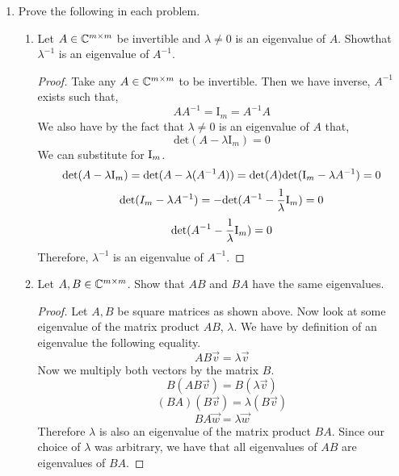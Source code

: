 \documentclass{article}
\begin{document}
\begin{enumerate}
\begin{proof}
We then define the matrix $C = A^*$, $C^* = A$. Notice that C is an upper triangular, unitary matrix. By the previous proof, $C$ is a diagonal matrix. Notice all of its ``off-diagonal'' elements are zero. As a consequnce, all (i, j)-elements of $C$ which are zero imply that (j, i)-elements of $C^*$ are zero. Therefore, $C^* = A$ is a diagonal matrix.


\end{proof}

\item 
Prove the following in each problem.
\begin{enumerate}

    \item
    Let $A \in \mathbb{C}^{m \times m}$ be invertible and $\lambda \neq 0$ is an eigenvalue of $A$. Showthat $\lambda^{-1}$ is an eigenvalue of $A^{-1}$.

    \begin{proof}

    Take any $A \in \mathbb{C}^{m\times m}$ to be invertible. Then we have inverse, $A^{-1}$ exists such that, 
    \[
        AA^{-1} = \mathrm{I}_m = A^{-1}A
    \]
    We also have by the fact that $\lambda \neq 0$ is an eigenvalue of $A$ that, 
    \[
        \text{det}(A - \lambda\mathrm{I}_m) = 0
    \]
    We can substitute for $\mathrm{I}_m$.
    \[
        \text{det}(A - \lambda\mathrm{I}_m) = \text{det}(A - \lambda(A^{-1}A)) =     \text{det}(A)\text{det}(\mathrm{I}_m - \lambda A^{-1}) = 0 
    \]
    \[
        \text{det}(I_m - \lambda A^{-1}) = -\text{det}(A^{-1} - \frac{1}{\lambda}\mathrm{I}_m) = 0
    \]
    \[
        \text{det}(A^{-1} - \frac{1}{\lambda}\mathrm{I}_m) = 0
    \]
    Therefore, $\lambda^{-1}$ is an eigenvalue of $A^{-1}$.
    
    \end{proof}


    \item 
    Let $A, B \in \mathbb{C}^{m\times m}$. Show that $AB$ and $BA$ have the same eigenvalues.
    
    \begin{proof}
    
    Let $A, B$ be square matrices as shown above. Now look at some eigenvalue of the   matrix product $AB$, $\lambda$. We have by definition of an eigenvalue the following equality.
    \[
        AB\vec{v} = \lambda\vec{v}
    \]
    Now we multiply both vectors by the matrix $B$.
    \[
        B(AB\vec{v}) = B(\lambda\vec{v})
    \]
    \[
       (BA)(B\vec{v}) = \lambda(B\vec{v})  
    \]
    \[
        BA\vec{w} = \lambda\vec{w}
    \]
    Therefore $\lambda$ is also an eigenvalue of the matrix product $BA$. Since our choice of $\lambda$ was arbitrary, we have that all eigenvalues of $AB$ are eigenvalues of $BA$. 
    \end{proof}



\end{enumerate}
\end{enumerate}
\end{document}
